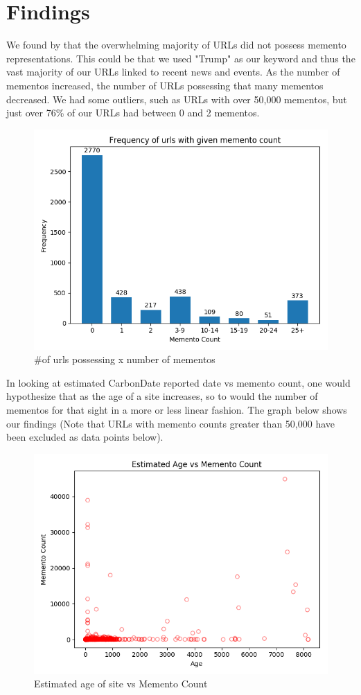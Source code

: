 \documentclass[11pt]{article}
\begin{document}
	\section{Findings}
	\hspace{10mm}We found by that the overwhelming majority of URLs did not possess memento representations. This could be that we used "Trump" as our keyword and thus the vast majority of our URLs linked to recent news and events. As the number of mementos increased, the number of URLs possessing that many mementos decreased. We had some outliers, such as URLs with over 50,000 mementos, but just over 76\% of our URLs had between 0 and 2 mementos. 
	\begin{figure}[h!]
		\includegraphics[scale=0.6]{resources/memento_count__vs__URI_count.png}
		\caption{\#of urls possessing x number of mementos}
	\end{figure}
	\hspace{10mm} In looking at estimated CarbonDate reported date vs memento count, one would hypothesize that as the age of a site increases, so to would the number of mementos for that sight in a more or less linear fashion. The graph below shows our findings (Note that URLs with memento counts greater than 50,000 have been excluded as data points below).  
	\begin{figure}[h!]
		\includegraphics[scale=0.6]{resources/scatter_50k.png}
		\caption{Estimated age of site vs Memento Count}
	\end{figure}
\end{document}
